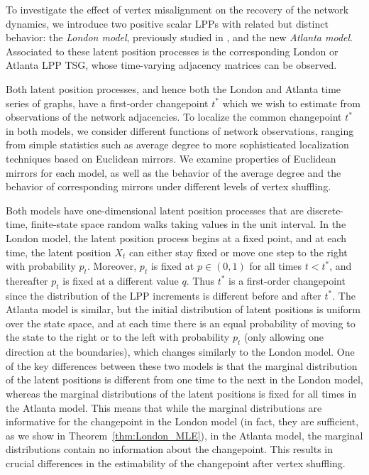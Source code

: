 \documentclass[12pt]{article}
\theoremstyle{definition}
\begin{document}
To investigate the effect of vertex misalignment on the recovery of the network dynamics, we introduce two positive scalar LPPs with related but distinct behavior: the \emph{London model}, previously studied in \cite{chen2023discovering}, and the new \emph{Atlanta model}. Associated to these latent position processes is the corresponding London or Atlanta LPP TSG, whose time-varying adjacency matrices can be observed.

Both latent position processes, and hence both the London and Atlanta time series of graphs, have a first-order changepoint $t^*$ which we wish to estimate from observations of the network adjacencies. 
To localize the common changepoint $t^*$ in both models, we consider different functions of network observations, ranging from simple statistics such as average degree to more sophisticated localization techniques based on Euclidean mirrors. We examine properties of Euclidean mirrors for each model, as well as the behavior of the average degree and the behavior of corresponding mirrors under different levels of vertex shuffling. 

Both models have one-dimensional latent position processes that are discrete-time, finite-state space random walks taking values in the unit interval. In the London model, the latent position process begins at a fixed point, and at each time, the latent position $X_t$ can either stay fixed or move one step to the right with probability $p_t$. Moreover, $p_t$ is fixed at $p \in (0,1)$ for all times $t<t^{*}$, and thereafter $p_t$ is fixed at a different value $q$. Thus $t^*$ is a first-order changepoint since the distribution of the LPP increments is different before and after $t^*$. The Atlanta model is similar, but the initial distribution of latent positions is uniform over the state space, and at each time there is an equal probability of moving to the state to the right or to the left with probability $p_t$ (only allowing one direction at the boundaries), which changes similarly to the London model. One of the key differences between these two models is that the marginal distribution of the latent positions is different from one time to the next in the London model, whereas the marginal distributions of the latent positions is fixed for all times in the Atlanta model. This means that while the marginal distributions are informative for the changepoint in the London model (in fact, they are sufficient, as we show in Theorem~\ref{thm:London_MLE}), in the Atlanta model, the marginal distributions contain no information about the changepoint. This results in crucial differences in the estimability of the changepoint after vertex shuffling. 
\end{document}
